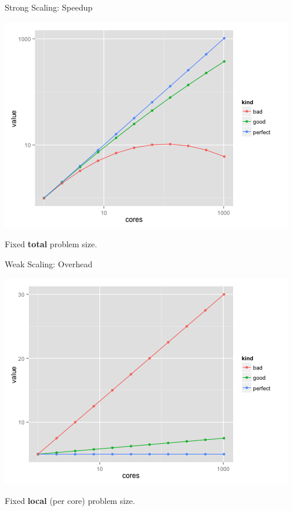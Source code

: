 \begin{frame}
  \begin{center}
    \begin{minipage}{.475\textwidth}
      \begin{block}{Strong Scaling: Speedup}
        \begin{center}
          \includegraphics[width=.95\textwidth]{../common/pics/scaling/scaling_strong}
        \end{center}
        Fixed \textbf{total} problem size.
      \end{block}
    \end{minipage}
    \hspace{.1cm}
    \begin{minipage}{.475\textwidth}
      \begin{block}{Weak Scaling: Overhead}
        \begin{center}
          \includegraphics[width=.95\textwidth]{../common/pics/scaling/scaling_weak}
        \end{center}
        Fixed \textbf{local} (per core) problem size.
      \end{block}
    \end{minipage}
  \end{center}
\end{frame}


